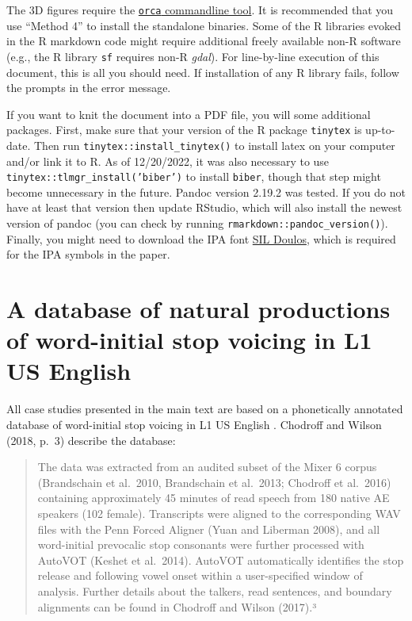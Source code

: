 \documentclass[
  11pt,
  man,floatsintext]{apa6}
\begin{document}
The 3D figures require the \href{https://github.com/plotly/orca\#installation}{\texttt{orca} commandline tool}. It is recommended that you use ``Method 4'' to install the standalone binaries. Some of the R libraries evoked in the R markdown code might require additional freely available non-R software (e.g., the R library \texttt{sf} requires non-R \emph{gdal}). For line-by-line execution of this document, this is all you should need. If installation of any R library fails, follow the prompts in the error message.

If you want to knit the document into a PDF file, you will some additional packages. First, make sure that your version of the R package \texttt{tinytex} is up-to-date. Then run \texttt{tinytex::install\_tinytex()} to install latex on your computer and/or link it to R. As of 12/20/2022, it was also necessary to use \texttt{tinytex::tlmgr\_install('biber')} to install \texttt{biber}, though that step might become unnecessary in the future. Pandoc version 2.19.2 was tested. If you do not have at least that version then update RStudio, which will also install the newest version of pandoc (you can check by running \texttt{rmarkdown::pandoc\_version()}). Finally, you might need to download the IPA font \href{https://software.sil.org/doulos/download/}{SIL Doulos}, which is required for the IPA symbols in the paper.

\section{\texorpdfstring{A database of natural productions of word-initial stop voicing in L1 US English \autocite{chodroff-wilson2018}}{A database of natural productions of word-initial stop voicing in L1 US English {[}@chodroff-wilson2018{]}}}\label{sec:SI-chodroff}

All case studies presented in the main text are based on a phonetically annotated database of word-initial stop voicing in L1 US English \autocite{chodroff-wilson2018}. Chodroff and Wilson (2018, p.~3) describe the database:

\begin{quote}
The data was extracted from an audited subset of the Mixer 6 corpus (Brandschain et al.~2010, Brandschain
et al.~2013; Chodroff et al.~2016) containing approximately 45 minutes of read speech from 180 native AE
speakers (102 female). Transcripts were aligned to the corresponding WAV files with the Penn Forced Aligner
(Yuan and Liberman 2008), and all word-initial prevocalic stop consonants were further processed with
AutoVOT (Keshet et al.~2014). AutoVOT automatically identifies the stop release and following vowel onset
within a user-specified window of analysis. Further details about the talkers, read sentences, and boundary
alignments can be found in Chodroff and Wilson (2017).³
\end{quote}
\end{document}
